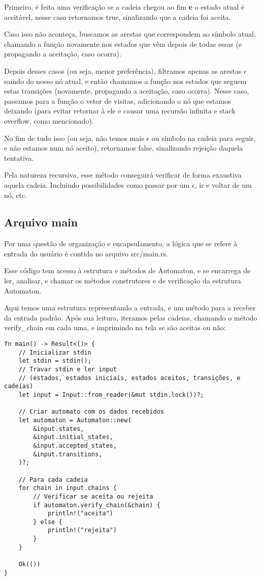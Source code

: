 \documentclass[12pt]{article}
\begin{document}
Primeiro, é feita uma verificação se a cadeia chegou ao fim \textbf{e} o estado atual é aceitável, nesse caso retornamos true, sinalizando que a cadeia foi aceita.

Caso isso não aconteça, buscamos as arestas que correspondem ao símbolo atual, chamando a função novamente nos estados que vêm depois de todas essas (e propagando a aceitação, caso ocorra).

Depois desses casos (ou seja, menor preferência), filtramos apenas as arestas \(\epsilon\) saindo do nosso nó atual, e então chamamos a função nos estados que seguem estas transições (novamente, propagando a aceitação, caso ocorra). Nesse caso, passamos para a função o vetor de visitas, adicionando o nó que estamos deixando (para evitar retornar à ele e causar uma recursão infinita e stack overflow, como mencionado).

No fim de tudo isso (ou seja, não temos mais \(\epsilon\) ou símbolo na cadeia para seguir, e não estamos num nó aceito), retornamos false, sinalizando rejeição daquela tentativa.


Pela natureza recursiva, esse método conseguirá verificar de forma exaustiva aquela cadeia. Incluindo possibilidades como passar por um \(\epsilon\), ir e voltar de um nó, etc.

\subsection{Arquivo main}
Por uma questão de organização e encapsulamento, a lógica que se refere à entrada do usuário é contida no arquivo src/main.rs.

Esse código tem acesso à estrutura e métodos de Automaton, e se encarrega de ler, analisar, e chamar os métodos construtores e de verificação da estrutura Automaton.

Aqui temos uma estrutura representando a entrada, e um método para a receber da entrada padrão. Após sua leitura, iteramos pelas cadeias, chamando o método verify\_chain em cada uma, e imprimindo na tela se são aceitas ou não:

\begin{verbatim}
fn main() -> Result<()> {
    // Inicializar stdin
    let stdin = stdin();
    // Travar stdin e ler input
    // (estados, estados iniciais, estados aceitos, transições, e cadeias)
    let input = Input::from_reader(&mut stdin.lock())?;

    // Criar automato com os dados recebidos
    let automaton = Automaton::new(
        &input.states,
        &input.initial_states,
        &input.accepted_states,
        &input.transitions,
    )?;

    // Para cada cadeia
    for chain in input.chains {
        // Verificar se aceita ou rejeita
        if automaton.verify_chain(&chain) {
            println!("aceita")
        } else {
            println!("rejeita")
        }
    }

    Ok(())
}
\end{verbatim}
\end{document}
